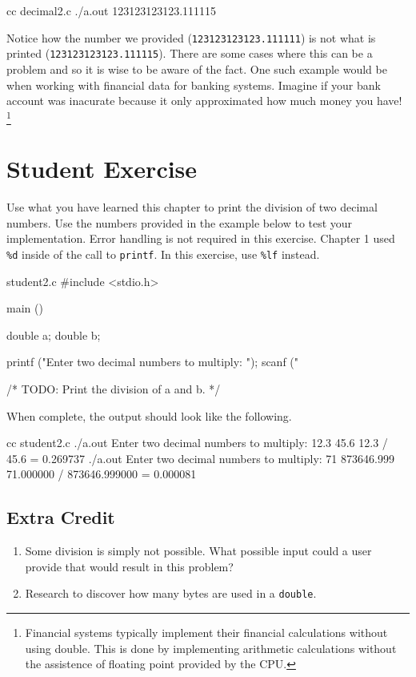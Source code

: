 \begin{Terminal}
cc decimal2.c
./a.out
123123123123.111115
\end{Terminal}

Notice how the number we provided (\verb|123123123123.111111|) is not what is
printed (\verb|123123123123.111115|).  There are some cases where this can be a
problem and so it is wise to be aware of the fact.  One such example would be
when working with financial data for banking systems.  Imagine if your bank
account was inacurate because it only approximated how much money you have!
\footnote{Financial systems typically implement their financial calculations
without using double. This is done by implementing arithmetic calculations
without the assistence of floating point provided by the CPU.}


\section{Student Exercise}

Use what you have learned this chapter to print the division of two decimal
numbers. Use the numbers provided in the example below to test your
implementation. Error handling is not required in this exercise. Chapter 1 used
\verb|%d| inside of the call to \verb|printf|. In this exercise, use \verb|%lf|
instead.

\begin{code}{student2.c}
#include <stdio.h>

main ()
{
    double a;
    double b;

    printf ("Enter two decimal numbers to multiply: ");
    scanf ("%

    /* TODO: Print the division of a and b. */
}
\end{code}

When complete, the output should look like the following.

\begin{Terminal}
cc student2.c
./a.out
Enter two decimal numbers to multiply: 12.3 45.6
12.3 / 45.6 = 0.269737
./a.out
Enter two decimal numbers to multiply: 71 873646.999
71.000000 / 873646.999000 = 0.000081
\end{Terminal}

\subsection{Extra Credit}

\begin{enumerate}
\item Some division is simply not possible. What possible input could a user provide
that would result in this problem?
\item Research to discover how many bytes are used in a \verb|double|.
\end{enumerate}
